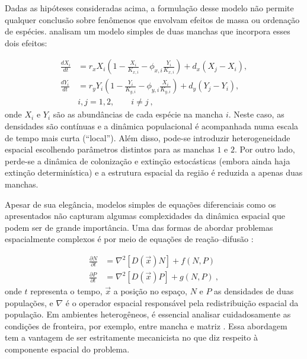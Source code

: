 \documentclass[12pt]{extarticle}
\begin{document}
Dadas as hipóteses consideradas acima, a formulação desse modelo não permite
qualquer conclusão sobre fenômenos que envolvam efeitos de massa ou ordenação
de espécies. \citet{amarasekare2001} analisam um modelo simples de duas
manchas que incorpora esses dois efeitos:

\begin{equation}
    \begin{aligned}
        \frac{dX_i}{dt} &= r_x X_i \left( 1 - \frac{X_i}{K_{x,i}} - \phi_{x,i}
        \frac{Y_i}{K_{x,i}} \right) + d_x (X_j - X_i), \\
        \frac{dY_i}{dt} &= r_y Y_i \left( 1 - \frac{Y_i}{K_{y,i}} - \phi_{y,i}
        \frac{X_i}{K_{y,i}} \right) + d_y (Y_j - Y_i), \\
        & i, j = 1, 2, \qquad i \neq j~,
    \end{aligned}
\end{equation}
onde $X_i$ e $Y_i$ são as abundâncias de cada espécie na mancha $i$. Neste
caso, as densidades são contínuas e a dinâmica populacional é acompanhada numa
escala de tempo mais curta (``local''). Além disso, pode-se introduzir
heterogeneidade espacial escolhendo parâmetros distintos para as manchas $1$ e
$2$. Por outro lado, perde-se a dinâmica de colonização e extinção
estocásticas (embora ainda haja extinção determinística) e a estrutura
espacial da região é reduzida a apenas duas manchas.

Apesar de sua elegância, modelos simples de equações diferenciais como os
apresentados não capturam algumas complexidades da dinâmica espacial que podem
ser de grande importância. Uma das formas de abordar problemas espacialmente
complexos é por meio de equações de reação--difusão \citep{murray2002}:

\begin{equation}
  \begin{aligned}
    \frac{\partial N}{\partial t} &= \nabla^2 \left[ D(\vec{x})N \right] + f(N,P)\\
    \frac{\partial P}{\partial t} &= \nabla^2 \left[ D(\vec{x})P \right] + g(N,P)~,
  \end{aligned}
\end{equation}
%
onde $t$ representa o tempo, $\vec{x}$ a posição no espaço, $N$ e $P$ as
densidades de duas populações, e $\nabla$ é o operador espacial responsável
pela redistribuição espacial da população. Em ambientes heterogêneos, é
essencial analisar cuidadosamente as condições de fronteira, por exemplo,
entre mancha e matriz \citep{turchin1998, ovaskainen2003}. Essa abordagem tem
a vantagem de ser estritamente mecanicista no que diz respeito à componente
espacial do problema.
\end{document}
